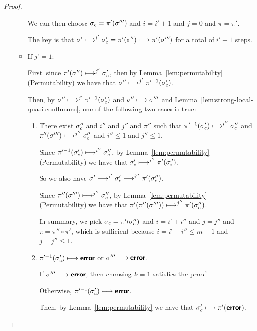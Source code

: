 \begin{proof}
\begin{enumerate}
\begin{itemize}
      We can then choose $\sigma_c = \pi'(\sigma''')$ and $i = i' + 1$
      and $j = 0$ and $\pi = \pi'$.

      The key is that $\sigma' \longmapsto^{i'} \sigma'_c =
      \pi'(\sigma'') \longmapsto \pi'(\sigma''')$ for a total of $i' +
      1$ steps.
      
    \item If $j' = 1$:

      First, since $\pi'(\sigma'') \longmapsto^{j'} \sigma'_c$, then
      by Lemma~\ref{lem:permutability} (Permutability) we have that
      $\sigma'' \longmapsto^{j'} \pi'^{-1}(\sigma'_c)$.
      
      Then, by $\sigma'' \longmapsto^{j'} \pi'^{-1}(\sigma'_c)$ and
      $\sigma'' \longmapsto \sigma'''$ and
      Lemma~\ref{lem:strong-local-quasi-confluence}, one of the
      following two cases is true:
      \begin{enumerate}
      \item There exist $\sigma_c''$ and $i''$ and $j''$ and $\pi''$
        such that $\pi'^{-1}(\sigma'_c) \longmapsto^{i''}
        \sigma_c''$ and $\pi''(\sigma''') \longmapsto^{j''} \sigma_c''$
        and $i'' \leq 1$ and $j'' \leq 1$.

        Since $\pi'^{-1}(\sigma'_c) \longmapsto^{i''} \sigma_c''$,
        by Lemma~\ref{lem:permutability} (Permutability) we have
        that $\sigma'_c \longmapsto^{i''} \pi'(\sigma_c'')$.

        So we also have $\sigma' \longmapsto^{i'} \sigma_c'
        \longmapsto^{i''} \pi'(\sigma_c'')$.

        Since $\pi''(\sigma''') \longmapsto^{j''} \sigma_c''$, by
        Lemma~\ref{lem:permutability} (Permutability) we have that
        $\pi'(\pi''(\sigma''')) \longmapsto^{j''} \pi'(\sigma_c'')$.

        In summary, we pick $\sigma_c = \pi'(\sigma_c'')$ and $i = i' + i''$
        and $j = j''$ and $\pi = \pi'' \circ \pi'$, which is sufficient
        because $i = i' + i'' \leq m + 1$ and $j = j'' \leq 1$.

      \item $\pi'^{-1}(\sigma'_c) \longmapsto \textbf{\textsf{error}}$ or $\sigma'''
        \longmapsto \textbf{\textsf{error}}$.

        If $\sigma''' \longmapsto \textbf{\textsf{error}}$, then choosing $k = 1$
        satisfies the proof.

        Otherwise, $\pi'^{-1}(\sigma'_c) \longmapsto \textbf{\textsf{error}}$.

        Then, by Lemma~\ref{lem:permutability} we have that
        $\sigma'_c \longmapsto \pi'(\textbf{\textsf{error}})$.


\end{enumerate}
\end{itemize}
\end{enumerate}
\end{proof}
